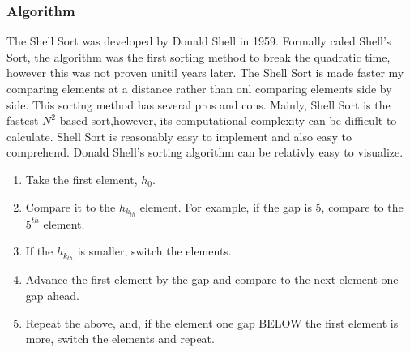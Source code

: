 \documentclass{article}
\begin{document}
   \subsubsection{Algorithm}
        The Shell Sort was developed by Donald Shell in 1959. Formally caled
        Shell's Sort, the algorithm was the first sorting method to break the 
        quadratic time, however this was not proven unitil years later. The 
        Shell Sort is made faster my comparing elements at a distance rather 
        than onl comparing elements side by side. This sorting method has
        several pros and cons\cite{introalg}. Mainly, Shell Sort is the
        fastest $N^2$ based sort,however, its computational complexity can be
        difficult to calculate\cite{princton}. Shell Sort is reasonably easy to
        implement and also easy to comprehend. 
        Donald Shell's sorting algorithm can be relativly easy to visualize.
        \begin{enumerate}
            \item Take the first element, $h_0$.
            \item Compare it to the $h_{k_{th}}$ element. For example, if the 
            gap is 5, compare to the $5^{th}$ element. 
            \item If the $h_{k_{th}}$ is smaller, switch the elements.
            \item Advance the first element by the gap and compare to the next 
            element one gap ahead.
            \item Repeat the above, and, if the element one gap BELOW the first
            element is more, switch the elements and repeat.
        \end{enumerate}
\end{document}
